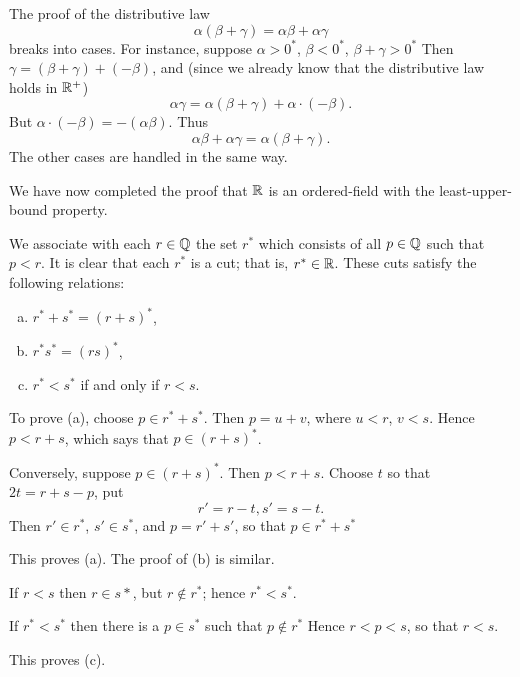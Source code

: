 The proof of the distributive law
\begin{equation*}
    \alpha(\beta + \gamma) = \alpha\beta + \alpha\gamma
\end{equation*}
breaks into cases.
For instance, suppose $\alpha> 0^*$, $\beta <0^*$, $\beta + \gamma > 0^*$
Then $\gamma = (\beta + \gamma) + (- \beta)$,
and (since we already know that the distributive law holds in ${\protect\mathbb R}^+$)
\begin{equation*}
    \alpha\gamma = \alpha(\beta+\gamma) + \alpha \cdot (-\beta).
\end{equation*}
But $\alpha \cdot (-\beta) = -(\alpha\beta)$. Thus
\begin{equation*}
    \alpha\beta + \alpha\gamma = \alpha(\beta + \gamma).
\end{equation*}
The other cases are handled in the same way.

We have now completed the proof that
${\protect\mathbb R}$ is an ordered-field with the least-upper-bound property.

\label{chap01_app_Step:8}
We associate with each $r\in {\protect\mathbb Q}$ the set $r^*$
which consists of all $p \in {\protect\mathbb Q}$ such that $p < r$.
It is clear that each $r^*$ is a cut;
that is, $r^* \in {\protect\mathbb R}$.
These cuts satisfy the following relations:
\begin{enumerate}[(a)]
    \item $r^* + s^* = (r+s)^*$,
    \item $r^* s^* = (rs)^*$,
    \item $r^* < s^*$ if and only if $r < s$.
\end{enumerate}

To prove (a), choose $p \in r^* + s^*$. Then $p=u+v$, where $u<r$, $v<s$.
Hence $p < r +s$, which says that $p \in (r + s)^*$.

Conversely, suppose $p \in (r+s)^*$. Then $p < r + s$. Choose $t$ so that
$2t = r + s - p$, put
\begin{equation*}
    r' = r - t,
    s' = s - t.
\end{equation*}
Then $r' \in r^*$, $s' \in s^*$, and $p = r' + s'$, so that $p \in r^* + s^*$

This proves (a). The proof of (b) is similar.

If $r < s$ then $r \in s*$, but $r \not\in r^*$;
hence $r^* < s^*$.

If $r^* <s^*$ then there is a $p \in s^*$
such that $p \not\in r^*$
Hence $r < p < s$, so that $r < s$.

This proves (c).

